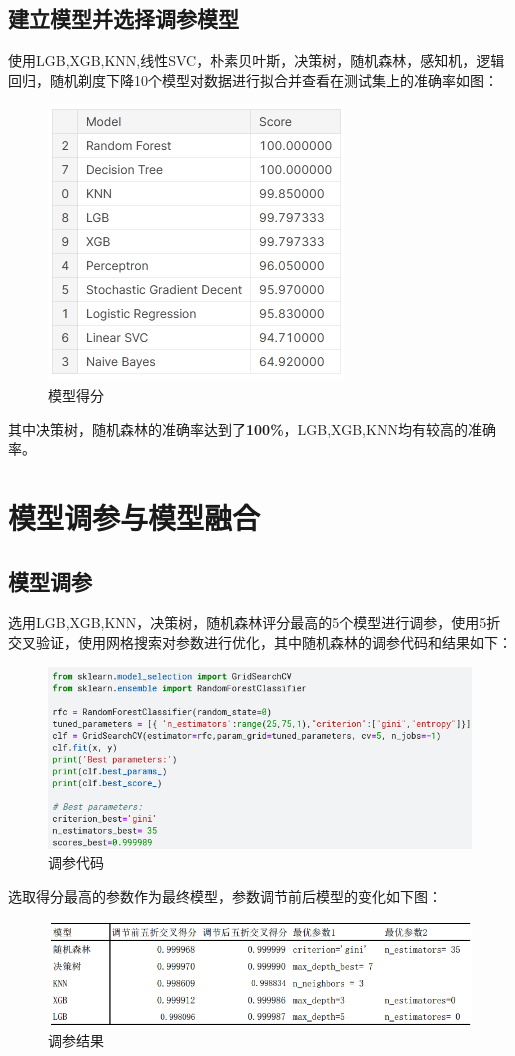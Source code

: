 \subsection{建立模型并选择调参模型}
使用LGB,XGB,KNN,线性SVC，朴素贝叶斯，决策树，随机森林，感知机，逻辑回归，随机剃度下降10个模型对数据进行拟合并查看在测试集上的准确率如图：
\begin{figure}[H]
	\centering
	\includegraphics[scale=0.75,angle=0]{images/10.png}
	\caption{模型得分}
	\label{10}
\end{figure}
其中决策树，随机森林的准确率达到了\textbf{100\%}，LGB,XGB,KNN均有较高的准确率。


\section{模型调参与模型融合}
\subsection{模型调参}
选用LGB,XGB,KNN，决策树，随机森林评分最高的5个模型进行调参，使用5折交叉验证，使用网格搜索对参数进行优化，其中随机森林的调参代码和结果如下：
\begin{figure}[H]
	\centering
	\includegraphics[scale=0.75,angle=0]{images/11.png}
	\caption{调参代码}
	\label{11}
\end{figure}
选取得分最高的参数作为最终模型，参数调节前后模型的变化如下图：
\begin{figure}[H]
	\centering
	\includegraphics[scale=0.75,angle=0]{images/12.png}
	\caption{调参结果}
	\label{12}
\end{figure}


